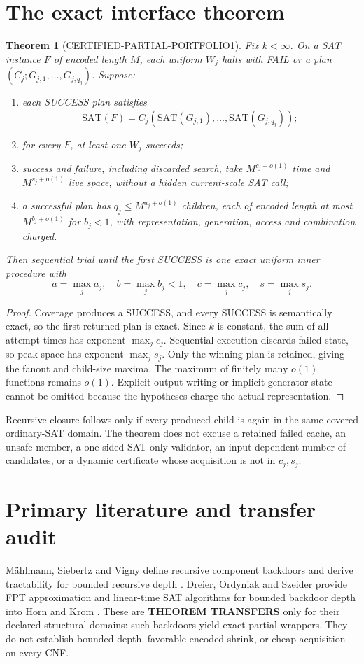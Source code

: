 \documentclass[11pt]{article}
\newtheorem{theorem}{Theorem}
\newcommand{\SAT}{\mathrm{SAT}}
\begin{document}
\section*{The exact interface theorem}
\begin{theorem}[CERTIFIED-PARTIAL-PORTFOLIO1]
Fix $k<\infty$.  On a SAT instance $F$ of encoded length $M$, each uniform
$W_j$ halts with FAIL or a plan
$(C_j;G_{j,1},\ldots,G_{j,q_j})$.  Suppose:
\begin{enumerate}
\item each SUCCESS plan satisfies
\[
\SAT(F)=C_j(\SAT(G_{j,1}),\ldots,\SAT(G_{j,q_j}));
\]
\item for every $F$, at least one $W_j$ succeeds;
\item success and failure, including discarded search, take
$M^{c_j+o(1)}$ time and $M^{s_j+o(1)}$ live space, without a hidden
current-scale SAT call;
\item a successful plan has $q_j\le M^{a_j+o(1)}$ children, each of encoded
length at most $M^{b_j+o(1)}$ for $b_j<1$, with representation, generation,
access and combination charged.
\end{enumerate}
Then sequential trial until the first SUCCESS is one exact uniform inner
procedure with
\[
a=\max_j a_j,
\quad b=\max_j b_j<1,
\quad c=\max_j c_j,
\quad s=\max_j s_j.
\]
\end{theorem}
\begin{proof}
Coverage produces a SUCCESS, and every SUCCESS is semantically exact, so the
first returned plan is exact.  Since $k$ is constant, the sum of all attempt
times has exponent $\max_j c_j$.  Sequential execution discards failed state,
so peak space has exponent $\max_j s_j$.  Only the winning plan is retained,
giving the fanout and child-size maxima.  The maximum of finitely many
$o(1)$ functions remains $o(1)$.  Explicit output writing or implicit
generator state cannot be omitted because the hypotheses charge the actual
representation.
\end{proof}

Recursive closure follows only if every produced child is again in the same
covered ordinary-SAT domain.  The theorem does not excuse a retained failed
cache, an unsafe member, a one-sided SAT-only validator, an input-dependent
number of candidates, or a dynamic certificate whose acquisition is not in
$c_j,s_j$.

\section*{Primary literature and transfer audit}
M{\"a}hlmann, Siebertz and Vigny define recursive component backdoors and
derive tractability for bounded recursive depth \cite{maehlmann2021}.
Dreier, Ordyniak and Szeider provide FPT approximation and linear-time SAT
algorithms for bounded backdoor depth into Horn and Krom
\cite{dreier2022}.  These are \textbf{THEOREM TRANSFERS} only for their
declared structural domains: such backdoors yield exact partial wrappers.
They do not establish bounded depth, favorable encoded shrink, or cheap
acquisition on every CNF.
\end{document}
